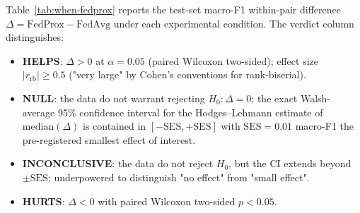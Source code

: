 Table~\ref{tab:when-fedprox} reports the test-set macro-F1
within-pair difference $\Delta = \mathrm{FedProx} - \mathrm{FedAvg}$
under each experimental condition. The verdict column distinguishes:

\begin{itemize}
  \item \textbf{HELPS}: $\Delta > 0$ at $\alpha = 0.05$ (paired Wilcoxon
        two-sided); effect size $|r_{\mathrm{rb}}| \geq 0.5$
        ("very large" by Cohen's conventions for rank-biserial).
  \item \textbf{NULL}: the data do not warrant rejecting
        $H_0: \Delta = 0$; the exact Walsh-average 95\% confidence
        interval for the Hodges--Lehmann estimate of
        $\mathrm{median}(\Delta)$ is contained in
        $[-\mathrm{SES}, +\mathrm{SES}]$ with
        $\mathrm{SES} = 0.01$ macro-F1 the pre-registered smallest
        effect of interest.
  \item \textbf{INCONCLUSIVE}: the data do not reject $H_0$, but the
        CI extends beyond $\pm\mathrm{SES}$; underpowered to
        distinguish "no effect" from "small effect".
  \item \textbf{HURTS}: $\Delta < 0$ with paired Wilcoxon
        two-sided $p < 0.05$.
\end{itemize}


